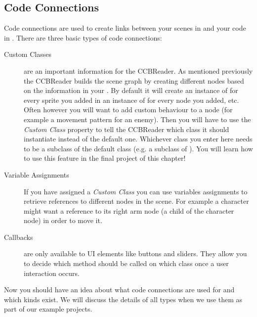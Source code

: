 \subsection{Code Connections}
\label{CodeConnections}
Code connections are used to create links between your scenes in \SB{} and your
code in \xcode{}. There are three basic types of code connections:
\begin{description}
\item[Custom Classes] are an important information for the CCBReader. As
mentioned previously the CCBReader builds the scene graph by creating different
nodes based on the information in your \ccbfile{}. By default it will create an
instance of \ccsprite{} for every sprite you added in \SB{} an instance of \ccnode{} for every node you added, etc. Often
however you will want to add custom behaviour to a node (for example a movement
pattern for an enemy). Then you will have to use the \textit{Custom Class}
property to tell the CCBReader which class it should instantiate instead of the
default one. Whichever class you enter here needs to be a subclass of the
default class (e.g. a subclass of \ccsprite{}). You will learn how to use this
feature in the final project of this chapter!
\item[Variable Assignments] If you have assigned a \textit{Custom Class} you can
use variables assignments to retrieve references to different nodes in the
scene. For example a character might want a reference to its right arm node (a
child of the character node) in order to move it. 
\item[Callbacks] are only available to UI elements like buttons and sliders.
They allow you to decide which method should be called on which class once a
user interaction occurs.
\end{description}
Now you should have an idea about what code connections are used for and which
kinds exist. We will discuss the details of all types when we use them as part
of our example projects.

